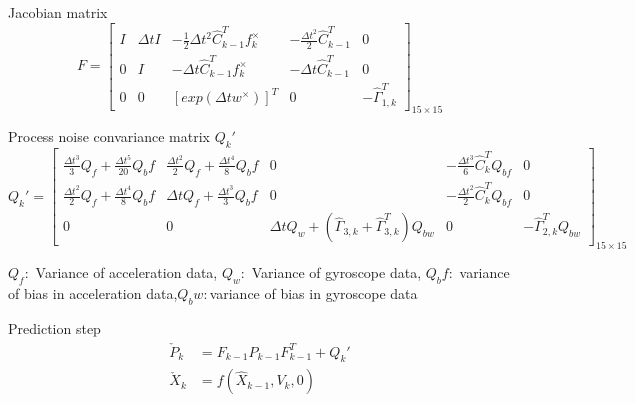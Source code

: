 \documentclass{cisXXX} %
\begin{document}
Jacobian matrix
\begin{equation}
\renewcommand\arraystretch{1.7}
F=\begin{bmatrix}
 I   & \Delta tI & -\frac{1}{2} \Delta t^2 \hat{C}_{k-1}^T f_k^{\times}  & -\frac{\Delta t^2}{2}\hat{C}_{k-1}^T &0 \\
 0   & I         & -\Delta t \hat{C}_{k-1}^T f_k^{\times}  &-\Delta t \hat{C}_{k-1}^T     &0 \\
 0   & 0         & [exp(\Delta t w^{\times})]^T & 0            & -\hat{\Gamma}^T_{1,k}
\end{bmatrix}_{15\times 15}
\end{equation}

Process noise convariance matrix $Q_k'$
\begin{equation}
\renewcommand\arraystretch{1.7}
Q_k' = \begin{bmatrix}
\frac{\Delta t^3}{3} Q_f + \frac{\Delta t^5}{20} Q_bf    & \frac{\Delta t^2}{2} Q_f + \frac{\Delta t^4}{8} Q_bf  &0    &-\frac{\Delta t^3}{6} \hat{C}_k^T Q_{bf}  &0\\
\frac{\Delta t^2}{2} Q_f + \frac{\Delta t^4}{8} Q_bf   & \Delta t Q_f + \frac{\Delta t^3}{3} Q_bf            &0   &-\frac{\Delta t^2}{2} \hat{C}_k^T Q_{bf}  &0\\
0                           &  0                   & \Delta t Q_w +(\hat{\Gamma}_{3,k}+\hat{\Gamma}_{3,k}^T) Q_{bw} &0 &-\hat{\Gamma}_{2,k}^T Q_{bw}   
\end{bmatrix}_{15\times 15}
\end{equation}

$Q_f: $ Variance of acceleration data, $Q_w: $ Variance of gyroscope data, $Q_bf: $ variance of bias in acceleration data,$Q_bw: $variance of bias in gyroscope data

Prediction step
\begin{equation}
\begin{split}
\check{P}_k &= F_{k-1}\hat{P}_{k-1}F_{k-1}^T+Q_k'  \\
\check{X}_k &= f(\hat{X}_{k-1},V_k,0)
\end{split}
\end{equation}
\end{document}
